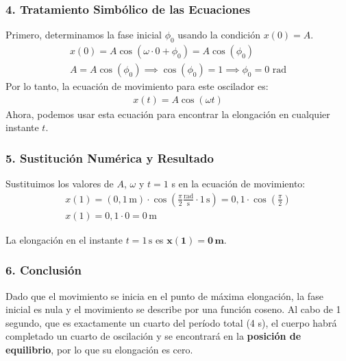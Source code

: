 \subsubsection*{4. Tratamiento Simbólico de las Ecuaciones}
Primero, determinamos la fase inicial $\phi_0$ usando la condición $x(0)=A$.
\begin{gather}
    x(0) = A \cos(\omega \cdot 0 + \phi_0) = A \cos(\phi_0) \nonumber \\[8pt]
    A = A \cos(\phi_0) \implies \cos(\phi_0) = 1 \implies \phi_0 = 0 \text{ rad}
\end{gather}
Por lo tanto, la ecuación de movimiento para este oscilador es:
\begin{gather}
    x(t) = A \cos(\omega t)
\end{gather}
Ahora, podemos usar esta ecuación para encontrar la elongación en cualquier instante $t$.

\subsubsection*{5. Sustitución Numérica y Resultado}
Sustituimos los valores de $A$, $\omega$ y $t=1$ s en la ecuación de movimiento:
\begin{gather}
    x(1) = (0,1 \, \text{m}) \cdot \cos\left(\frac{\pi}{2} \frac{\text{rad}}{\text{s}} \cdot 1 \, \text{s}\right) = 0,1 \cdot \cos\left(\frac{\pi}{2}\right) \nonumber \\[8pt]
    x(1) = 0,1 \cdot 0 = 0 \, \text{m}
\end{gather}
\begin{cajaresultado}
    La elongación en el instante $t=1\,\text{s}$ es $\boldsymbol{x(1) = 0 \, \textbf{m}}$.
\end{cajaresultado}

\subsubsection*{6. Conclusión}
\begin{cajaconclusion}
    Dado que el movimiento se inicia en el punto de máxima elongación, la fase inicial es nula y el movimiento se describe por una función coseno. Al cabo de 1 segundo, que es exactamente un cuarto del período total (4 s), el cuerpo habrá completado un cuarto de oscilación y se encontrará en la \textbf{posición de equilibrio}, por lo que su elongación es cero.
\end{cajaconclusion}

\newpage

